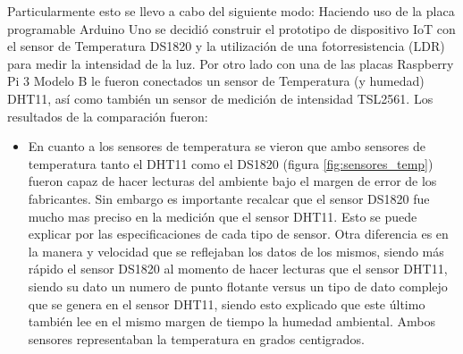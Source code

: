 Particularmente esto se llevo a cabo del siguiente modo: Haciendo uso de la placa programable Arduino Uno se decidió construir el prototipo de dispositivo IoT con el sensor de Temperatura DS1820 y la utilización de una fotorresistencia (LDR) para medir la intensidad de la luz. Por otro lado con una de las placas Raspberry Pi 3 Modelo B le fueron conectados un sensor de Temperatura (y humedad) DHT11, así como también un sensor de medición de intensidad TSL2561. Los resultados de la comparación fueron: 
\begin{itemize}
\item En cuanto a los sensores de temperatura se vieron que ambo sensores de temperatura tanto el DHT11 como el DS1820 (figura \ref{fig:sensores_temp}) fueron capaz de hacer lecturas del ambiente bajo el margen de error de los fabricantes. Sin embargo es importante recalcar que el sensor DS1820 fue mucho mas preciso en la medición que el sensor DHT11. Esto se puede explicar por las especificaciones de cada tipo de sensor. Otra diferencia es en la manera y velocidad que se reflejaban los datos de los mismos, siendo más rápido el sensor DS1820 al momento de hacer lecturas que el sensor DHT11, siendo su dato un numero de punto flotante versus un tipo de dato complejo que se genera en el sensor DHT11, siendo esto explicado que este último también lee en el mismo margen de tiempo la humedad ambiental. Ambos sensores representaban la temperatura en grados centigrados.


\end{itemize}
